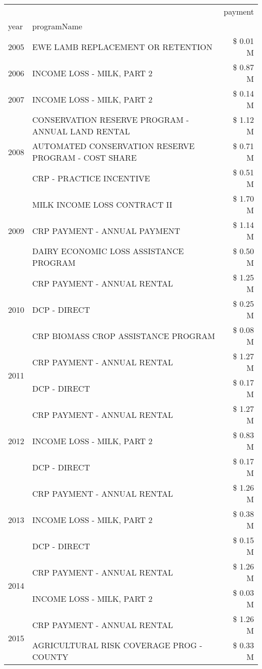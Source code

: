 \begin{tabular}{llr}
\toprule
 &  & payment \\
year & programName &  \\
\midrule
2005 & EWE LAMB REPLACEMENT OR RETENTION & \$ 0.01 M \\
\cline{1-3}
2006 & INCOME LOSS - MILK, PART 2 & \$ 0.87 M \\
\cline{1-3}
2007 & INCOME LOSS - MILK, PART 2 & \$ 0.14 M \\
\cline{1-3}
\multirow[t]{3}{*}{2008} & CONSERVATION RESERVE PROGRAM - ANNUAL LAND RENTAL & \$ 1.12 M \\
 & AUTOMATED CONSERVATION RESERVE PROGRAM - COST SHARE & \$ 0.71 M \\
 & CRP - PRACTICE INCENTIVE & \$ 0.51 M \\
\cline{1-3}
\multirow[t]{3}{*}{2009} & MILK INCOME LOSS CONTRACT II & \$ 1.70 M \\
 & CRP PAYMENT - ANNUAL PAYMENT & \$ 1.14 M \\
 & DAIRY ECONOMIC LOSS ASSISTANCE PROGRAM & \$ 0.50 M \\
\cline{1-3}
\multirow[t]{3}{*}{2010} & CRP PAYMENT - ANNUAL RENTAL & \$ 1.25 M \\
 & DCP - DIRECT & \$ 0.25 M \\
 & CRP BIOMASS CROP ASSISTANCE PROGRAM & \$ 0.08 M \\
\cline{1-3}
\multirow[t]{2}{*}{2011} & CRP PAYMENT - ANNUAL RENTAL & \$ 1.27 M \\
 & DCP - DIRECT & \$ 0.17 M \\
\cline{1-3}
\multirow[t]{3}{*}{2012} & CRP PAYMENT - ANNUAL RENTAL & \$ 1.27 M \\
 & INCOME LOSS - MILK, PART 2 & \$ 0.83 M \\
 & DCP - DIRECT & \$ 0.17 M \\
\cline{1-3}
\multirow[t]{3}{*}{2013} & CRP PAYMENT - ANNUAL RENTAL & \$ 1.26 M \\
 & INCOME LOSS - MILK, PART 2 & \$ 0.38 M \\
 & DCP - DIRECT & \$ 0.15 M \\
\cline{1-3}
\multirow[t]{2}{*}{2014} & CRP PAYMENT - ANNUAL RENTAL & \$ 1.26 M \\
 & INCOME LOSS - MILK, PART 2 & \$ 0.03 M \\
\cline{1-3}
\multirow[t]{2}{*}{2015} & CRP PAYMENT - ANNUAL RENTAL & \$ 1.26 M \\
 & AGRICULTURAL RISK COVERAGE PROG - COUNTY & \$ 0.33 M \\

\end{tabular}
